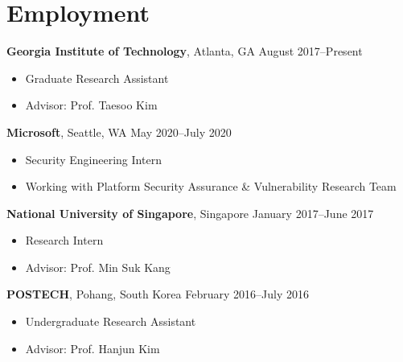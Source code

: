 \section*{Employment}

\begin{description}
\item {\bf Georgia Institute of Technology}, Atlanta, GA \dotfill August 2017--Present
  \begin{itemize}
      \item Graduate Research Assistant
  \item Advisor: Prof. Taesoo Kim
  \end{itemize}

\item {\bf Microsoft}, Seattle, WA \dotfill May 2020--July 2020
  \begin{itemize}
      \item Security Engineering Intern
      \item Working with Platform Security Assurance \& Vulnerability Research Team
  \end{itemize}

  
\item {\bf National University of Singapore}, Singapore \dotfill January 2017--June 2017
  \begin{itemize}
  \item Research Intern
  \item Advisor: Prof. Min Suk Kang
  \end{itemize}

\item {\bf POSTECH}, Pohang, South Korea \dotfill February 2016--July 2016
  \begin{itemize}
  \item Undergraduate Research Assistant
  \item Advisor: Prof. Hanjun Kim
  \end{itemize}
\end{description}
